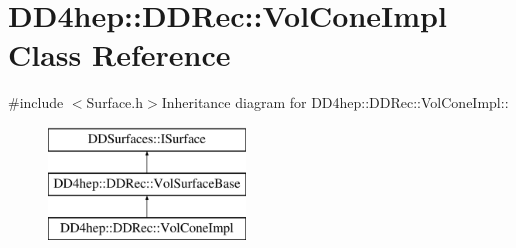 \hypertarget{class_d_d4hep_1_1_d_d_rec_1_1_vol_cone_impl}{
\section{DD4hep::DDRec::VolConeImpl Class Reference}
\label{class_d_d4hep_1_1_d_d_rec_1_1_vol_cone_impl}
}


{\ttfamily \#include $<$Surface.h$>$}Inheritance diagram for DD4hep::DDRec::VolConeImpl::\begin{figure}[H]
\begin{center}
\leavevmode
\includegraphics[height=3cm]{class_d_d4hep_1_1_d_d_rec_1_1_vol_cone_impl}
\end{center}
\end{figure}
